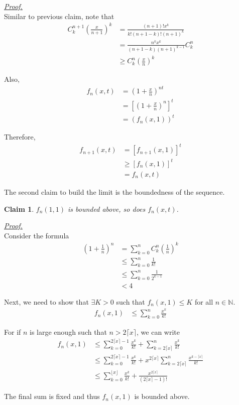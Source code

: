 \documentclass[12pt]{article}
\newtheorem*{claim}{Claim}
\renewenvironment{proof}[1][Proof]{\begin{snugshade*} \underline{\textit{{#1}.}}\\}{\hfill \qedsymbol \end{snugshade*}}
\begin{document}
    \begin{proof}
        Similar to previous claim, note that \begin{align*}
            C_k^{n+1}(\frac{x}{n+1})^k&=\frac{(n+1)!x^k}{k!(n+1-k)!(n+1)^k}\\
            &=\frac{n^k x^k}{(n+1-k)(n+1)^{k-1}}C_k^n\\
            &\geq C_k^n(\frac{x}{n})^k
        \end{align*}

        Also, \begin{align*}
            f_n(x,t)&=(1+\frac{x}{n})^{nt}\\
            &=[(1+\frac{x}{n})^n]^t\\
            &=(f_n(x,1))^t
        \end{align*}

        Therefore, \begin{align*}
            f_{n+1}(x,t)&=[f_{n+1}(x,1)]^t\\
            &\geq [f_n(x,1)]^t\\
            &=f_n(x,t)
        \end{align*}
    \end{proof}

    The second claim to build the limit is the boundedness of the sequence.

    \begin{claim}
        $f_n(1,1)$ is bounded above, so does $f_n(x,t)$.
    \end{claim}

    \begin{proof}
        Consider the formula \begin{align*}
            (1+\frac{1}{n})^n&=\sum_{k=0}^{n}C_k^n(\frac{1}{n})^k\\
            &\leq \sum_{k=0}^{n}\frac{1}{k!}\\
            &\leq \sum_{k=0}^{n}\frac{1}{2^{k-1}}\\
            &<4
        \end{align*}

        Next, we need to show that $\exists K>0$ such that $f_n(x,1)\leq K$ for all $n\in\mathbb{N}$.\begin{align*}
            f_n(x,1)&\leq \sum_{k=0}^{n}\frac{x^k}{k!}
        \end{align*} 

        For if $n$ is large enough such that $n>2\lceil x\rceil$, we can write \begin{align*}
            f_n(x,1)&\leq \sum_{k=0}^{2\lceil x \rceil-1}\frac{x^k}{k!}+\sum_{k=2\lceil x\rceil}^{n}\frac{x^k}{k!}\\
            &\leq \sum_{k=0}^{2\lceil x \rceil-1}\frac{x^k}{k!}+x^{2\lceil x \rceil}\sum_{k=2\lceil x\rceil}^{n}\frac{x^{k-\lceil x \rceil}}{k!}\\
            &\leq \sum_{k=0}^{\lfloor x \rfloor}\frac{x^k}{k!}+\frac{x^{2\lceil x \rceil}}{(2\lceil x \rceil-1)!}
        \end{align*}

        The final sum is fixed and thus $f_n(x,1)$ is bounded above.
    \end{proof}
\end{document}
